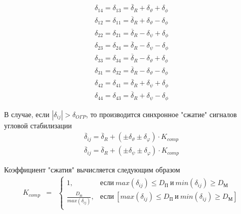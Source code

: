 \begin{equation}
	\begin{gathered}
		\delta_{14} = \delta_{13} = \overline{\delta}_R + \delta_\vartheta + \delta_\phi \\
		\delta_{12} = \delta_{11} = \overline{\delta}_R + \delta_\vartheta - \delta_\phi \\
		\delta_{22} = \delta_{21} = \overline{\delta}_R - \delta_\psi + \delta_\phi \\
		\delta_{23} = \delta_{24} = \overline{\delta}_R - \delta_\psi - \delta_\phi \\
		\delta_{33} = \delta_{34} = \overline{\delta}_R - \delta_\vartheta + \delta_\phi \\
		\delta_{31} = \delta_{32} = \overline{\delta}_R - \delta_\vartheta - \delta_\phi \\
		\delta_{42} = \delta_{41} = \overline{\delta}_R + \delta_\psi + \delta_\phi \\
		\delta_{44} = \delta_{43} = \overline{\delta}_R + \delta_\psi - \delta_\phi 
	\end{gathered}
\end{equation}

В случае, если $|\delta_{ij}| > \delta_{O\Gamma P}$, то производится синхронное "сжатие" сигналов угловой стабилизации
\begin{equation}
	\begin{gathered}
		\overline{\delta}_{ij} = \overline{\delta}_R + \left( \pm \delta_{\vartheta} \pm \delta_{\varphi} \right) \cdot K_{comp} \\
		\overline{\delta}_{ij} = \overline{\delta}_R + \left( \pm \delta_{\psi} \pm \delta_{\varphi} \right) \cdot K_{comp}
	\end{gathered}
\end{equation}

Коэффициент "сжатия" вычисляется следующим образом
\begin{equation}
	\begin{matrix}
		K_{comp} & = & \left\{ \begin{matrix}
			1, & \text{если} \  max(\delta_{ij}) \leq D_{\text{П}} \  \text{и} \  min(\delta_{ij}) \geq D_\text{М} \\
			\frac{D_\text{П}}{max(\delta_{ij})}, &  \text{если} \  \left[max(\delta_{ij}) \leq D_{\text{П}} \  \text{и} \  min(\delta_{ij}) \geq D_\text{М} \right] \\
		\end{matrix}\right.
	\end{matrix} 
\end{equation}

\clearpage